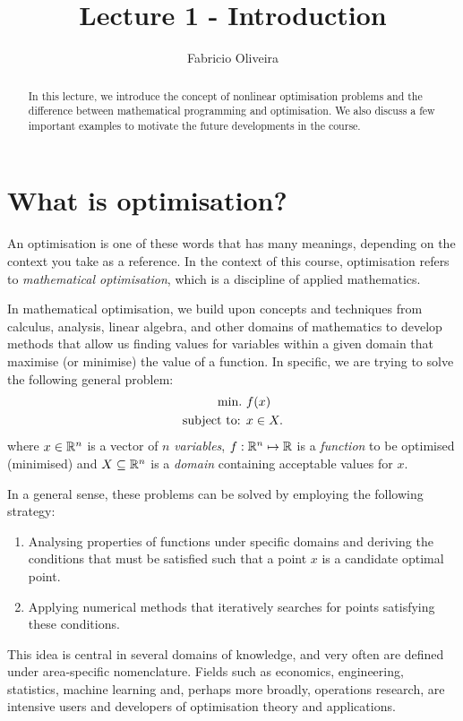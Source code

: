 \documentclass{article}
\title{Lecture 1 - Introduction}
\author{Fabricio Oliveira}
\begin{document}
\begin{titlepage}
\singlespacing
\thispagestyle{empty}

\maketitle

\begin{abstract} In this lecture, we introduce the concept of nonlinear optimisation problems and the difference between mathematical programming and optimisation. We also discuss a few important examples to motivate the future developments in the course. 

\end{abstract}

\tableofcontents
\end{titlepage}

\onehalfspacing


\section{What is optimisation?}

An optimisation is one of these words that has many meanings, depending on the context you take as a reference. In the context of this course, optimisation refers to \emph{mathematical optimisation}, which is a discipline of applied mathematics.

In mathematical optimisation, we build upon concepts and techniques from calculus, analysis, linear algebra, and other domains of mathematics to develop methods that allow us finding values for variables within a given domain that maximise (or minimise) the value of a function. In specific, we are trying to solve the following general problem:
%
\begin{align}
    \mathop{\text{min.} \ } &f(x) \label{eq:opt_prob} \\
    \mbox{subject to: }   &x \in X. \nonumber
\end{align}
%
where $x \in \mathbb R^n$ is a vector of $n$ \emph{variables}, $f:\mathbb R^n \mapsto \mathbb R$ is a \emph{function} to be optimised (minimised) and $X \subseteq \mathbb R^n$ is a \emph{domain} containing acceptable values for $x$.

In a general sense, these problems can be solved by employing the following strategy:
%
\begin{enumerate}
    \item Analysing properties of functions under specific domains and deriving the conditions that must be satisfied such that a point $x$ is a candidate optimal point.
    \item Applying numerical methods that iteratively searches for points satisfying these conditions. 
\end{enumerate}
%
This idea is central in several domains of knowledge, and very often are defined under area-specific nomenclature. Fields such as economics, engineering, statistics, machine learning and, perhaps more broadly, operations research, are intensive users and developers of optimisation theory and applications. 
\end{document}
